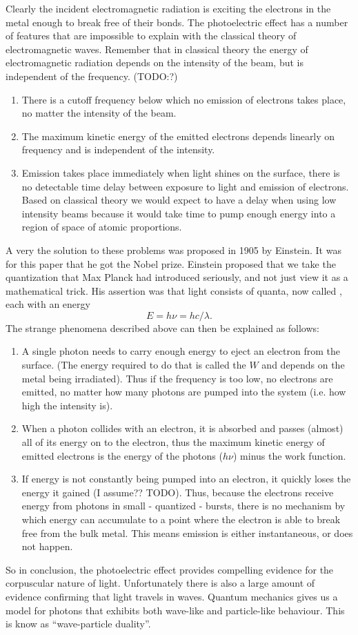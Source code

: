 Clearly the incident electromagnetic radiation is exciting the electrons in the metal enough to break free of their bonds. The photoelectric effect has a number of features that are impossible to explain with the classical theory of electromagnetic waves. Remember that in classical theory the energy of electromagnetic radiation depends on the intensity of the beam, but is independent of the frequency. (TODO:?)
\begin{enumerate}
\item There is a cutoff frequency below which no emission of electrons takes place, no matter the intensity of the beam.
\item The maximum kinetic energy of the emitted electrons depends linearly on frequency and is independent of the intensity.
\item Emission takes place immediately when light shines on the surface, there is no detectable time delay between exposure to light and emission of electrons. Based on classical theory we would expect to have a delay when using low intensity beams because it would take time to pump enough energy into a region of space of atomic proportions.
\end{enumerate}
A very the solution to these problems was proposed in 1905 by Einstein. It was for this paper that he got the Nobel prize. Einstein proposed that we take the quantization that Max Planck had introduced seriously, and not just view it as a mathematical trick. His assertion was that light consists of quanta, now called , each with an energy
\[ E = h\nu = hc / \lambda. \]
The strange phenomena described above can then be explained as follows:
\begin{enumerate}
\item A single photon needs to carry enough energy to eject an electron from the surface. (The energy required to do that is called the  $W$ and depends on the metal being irradiated). Thus if the frequency is too low, no electrons are emitted, no matter how many photons are pumped into the system (i.e. how high the intensity is).
\item When a photon collides with an electron, it is absorbed and passes (almost) all of its energy on to the electron, thus the maximum kinetic energy of emitted electrons is the energy of the photons ($h\nu$) minus the work function.
\item If energy is not constantly being pumped into an electron, it quickly loses the energy it gained (I assume?? TODO). Thus, because the electrons receive energy from photons in small - quantized - bursts, there is no mechanism by which energy can accumulate to a point where the electron is able to break free from the bulk metal. This means emission is either instantaneous, or does not happen.
\end{enumerate}
So in conclusion, the photoelectric effect provides compelling evidence for the corpuscular nature of light. Unfortunately there is also a large amount of evidence confirming that light travels in waves. Quantum mechanics gives us a model for photons that exhibits both wave-like and particle-like behaviour. This is know as ``wave-particle duality''.



